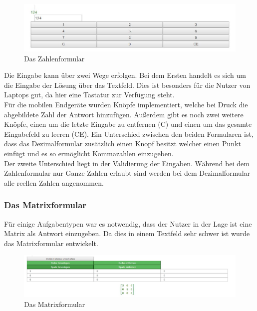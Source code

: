 \begin{figure}[htp]     %
\centering
\includegraphics[width=1\textwidth]{bilder/NumberForm} 
\caption[Das Zahlenformular]{Das Zahlenformular}
\end{figure} 

Die Eingabe kann über zwei Wege erfolgen. Bei dem Ersten handelt es sich um die Eingabe der Lösung über das Textfeld. Dies ist besonders für die Nutzer von Laptops gut, da hier eine Tastatur zur Verfügung steht. \\
Für die mobilen Endgeräte wurden Knöpfe implementiert, welche bei Druck die abgebildete Zahl der Antwort hinzufügen. Außerdem gibt es noch zwei weitere Knöpfe, einen um die letzte Eingabe zu entfernen (C) und einen um das gesamte Eingabefeld zu leeren (CE). Ein Unterschied zwischen den beiden Formularen ist, dass das Dezimalformular zusätzlich einen Knopf besitzt welcher einen Punkt einfügt und es so ermöglicht Kommazahlen einzugeben. \\
Der zweite Unterschied liegt in der Validierung der Eingaben. Während bei dem Zahlenformular nur Ganze Zahlen erlaubt sind werden bei dem Dezimalformular alle reellen Zahlen angenommen.

\subsubsection{Das Matrixformular}

Für einige Aufgabentypen war es notwendig, dass der Nutzer in der Lage ist eine Matrix als Antwort einzugeben. Da dies in einem Textfeld sehr schwer ist wurde das Matrixformular entwickelt. \\

\begin{figure}[htp]     %
\centering
\includegraphics[width=1\textwidth]{bilder/MatrixForm} 
\caption[Das Matrixformular]{Das Matrixformular}
\end{figure} 

